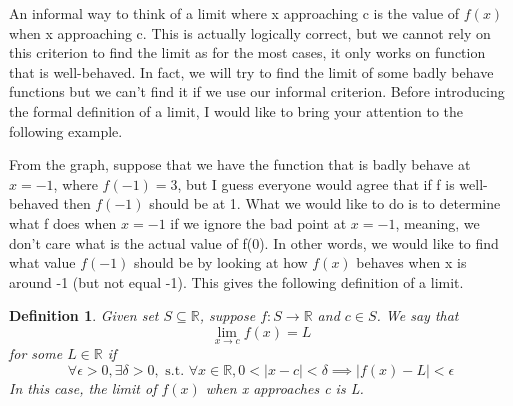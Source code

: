 \documentclass{book}
\newtheorem{definition}[theorem]{Definition}
\begin{document}
An informal way to think of a limit where x approaching c is the value of $f(x)$ when x approaching c. This is actually logically correct, but we cannot rely on this criterion to find the limit as for the most cases, it only works on function that is well-behaved. In fact, we will try to find the limit of some badly behave functions but we can't find it if we use our informal criterion. Before introducing the formal definition of a limit, I would like to bring your attention to the following example.
\begin{center}
\end{center}

From the graph, suppose that we have the function that is badly behave at $x = -1$, where $f(-1) = 3$, but I guess everyone would agree that if f is well-behaved then $f(-1)$ should be at 1. What we would like to do is to determine what f does when $x = -1$ if we ignore the bad point at $x = -1$, meaning, we don't care what is the actual value of f(0). In other words, we would like to find what value $f(-1)$ should be by looking at how $f(x)$ behaves when x is around -1 (but not equal -1). This gives the following definition of a limit.

\begin{definition}
    Given set $S \subseteq \mathbb{R}$, suppose $f : S \rightarrow \mathbb{R}$ and $c \in S$. We say that
    $$\lim_{x \rightarrow c} f(x) = L$$
    for some $L \in \mathbb{R}$ if
    $$\forall \epsilon > 0, \exists \delta > 0, \text{ s.t. } \forall x \in \mathbb{R}, 0 < |x - c| < \delta \implies |f(x) - L| < \epsilon$$
    In this case, the limit of $f(x)$ when x approaches c is L.
\end{definition}
\end{document}
